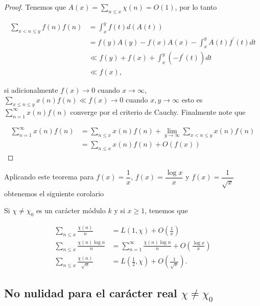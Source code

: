 \begin{proof}
Tenemos que $A(x)=\displaystyle \sum_{n\leq x}\chi(n)=O(1)$, por lo tanto 

$$
\begin{aligned}
\sum_{x< n \leqslant y} f(n) f(n) & =\int_x^y f(t) d(A(t)) \\
& =f(y) A(y)-f(x) A(x)-\int_x^y A(t) f^{\prime}(t) d t \\
& \ll f(y)+f(x)+\int_x^y\left(-f^{\prime}(t)\right) d t \\
& \ll f(x),
\end{aligned}
$$

si adicionalmente $f(x) \rightarrow 0$ cuando $x \rightarrow \infty$, $\displaystyle\sum_{x \leqslant n \leqslant y} x(n) f(n) \ll f(x) \rightarrow 0$ cuando $x, y \rightarrow \infty$ esto es $\displaystyle\sum_{n=1}^{\infty} x(n) f(n)$ converge por el criterio de Cauchy. Finalmente note que 

$$
\begin{aligned}
\sum_{n=1}^{\infty} x(n) f(n) & =\sum_{n \leqslant x} x(n) f(n)+\lim _{y \rightarrow \infty} \sum_{x<n \leqslant y} x(n) f(n) \\
&=\sum_{n \leqslant x} x(n) f(n)+O(f(x))
\end{aligned}$$
\end{proof}

Aplicando este teorema para $f(x)=\dfrac{1}{x}$, $f(x)=\dfrac{\log x}{x}$ y $f(x)=\dfrac{1}{\sqrt{x} }$ obtenemos el siguiente corolario

\begin{corollary}
Si $\chi\neq\chi_0$ es un carácter módulo $k$ y si $x\geq 1$, tenemos que

$$\begin{aligned}
\sum_{n \leqslant x} \frac{\chi(n)}{n} & =L(1, \chi)+O\left(\frac{1}{x}\right) \\
\sum_{n \leqslant x} \frac{\chi(n) \log n}{n} & =\sum_{n=1}^{\infty} \frac{\chi(n) \log n}{n}+O\left(\frac{\log x}{x}\right) \\
\sum_{n \leqslant x} \frac{\chi(n)}{\sqrt{n}} & =L\left(\frac{1}{2}, \chi\right)+O\left(\frac{1}{\sqrt{x}}\right) .
\end{aligned}$$
\end{corollary}

\subsection{No nulidad para el carácter real \texorpdfstring{$\chi\neq\chi_0$}{Lg}}


